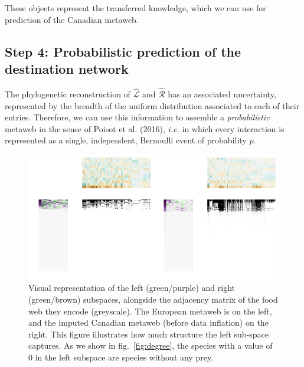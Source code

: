 \documentclass[10pt,oneside]{article}
\makeatletter
\def\maxwidth{\ifdim\Gin@nat@width>\linewidth\linewidth
\else\Gin@nat@width\fi}
\let\Oldincludegraphics\includegraphics
\renewcommand{\includegraphics}[1]{\Oldincludegraphics[width=\maxwidth]{#1}}
\makeatother
\begin{document}
These objects represent the transferred knowledge, which we can use for
prediction of the Canadian metaweb.

\hypertarget{step-4-probabilistic-prediction-of-the-destination-network}{%
\subsection{Step 4: Probabilistic prediction of the destination
network}\label{step-4-probabilistic-prediction-of-the-destination-network}}

The phylogenetic reconstruction of \(\hat{\mathcal{L}}\) and
\(\hat{\mathcal{R}}\) has an associated uncertainty, represented by the
breadth of the uniform distribution associated to each of their entries.
Therefore, we can use this information to assemble a
\emph{probabilistic} metaweb in the sense of Poisot et al. (2016),
\emph{i.e.} in which every interaction is represented as a single,
independent, Bernoulli event of probability \(p\).

\begin{figure}
\hypertarget{fig:subspaces}{%
\centering
\includegraphics{figures/figure-subspaces.png}
\caption{Visual representation of the left (green/purple) and right
(green/brown) subspaces, alongside the adjacency matrix of the food web
they encode (greyscale). The European metaweb is on the left, and the
imputed Canadian metaweb (before data inflation) on the right. This
figure illustrates how much structure the left sub-space captures. As we
show in fig.~\ref{fig:degree}, the species with a value of 0 in the left
subspace are species without any prey.}\label{fig:subspaces}
}
\end{figure}
\end{document}
